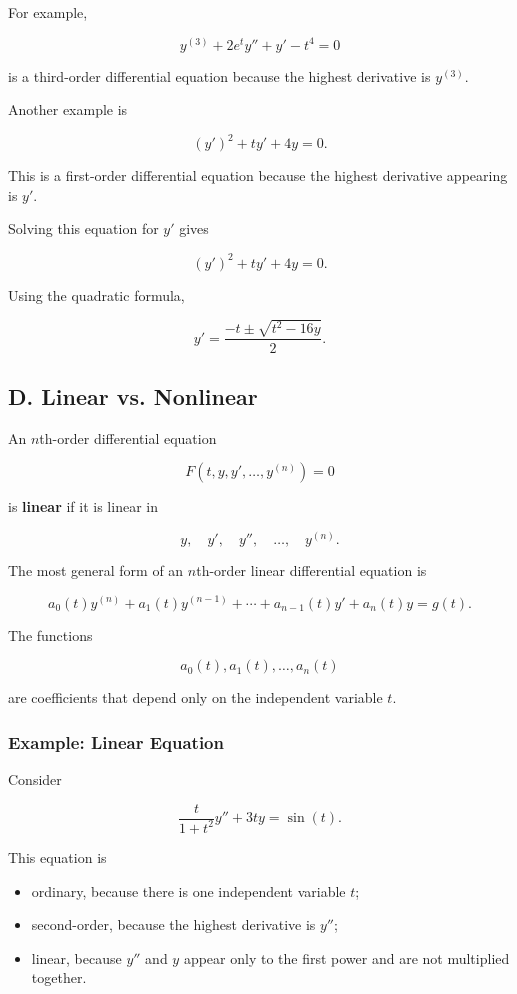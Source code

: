 \documentclass[11pt]{article}
\begin{document}
For example,

\[
y^{(3)}
+
2e^t y''
+
y'
-
t^4
=
0
\]

is a third-order differential equation because the highest derivative
is $y^{(3)}$.

Another example is

\[
(y')^2+ty'+4y=0.
\]

This is a first-order differential equation because the highest
derivative appearing is $y'$.

Solving this equation for $y'$ gives

\[
(y')^2+ty'+4y=0.
\]

Using the quadratic formula,

\[
\boxed{
y'
=
\frac{-t\pm\sqrt{t^2-16y}}{2}
}.
\]

\subsection{D. Linear vs. Nonlinear}

An $n$th-order differential equation

\[
F\left(
t,y,y',\ldots,y^{(n)}
\right)=0
\]

is \textbf{linear} if it is linear in

\[
y,\quad y',\quad y'',\quad\ldots,\quad y^{(n)}.
\]

The most general form of an $n$th-order linear differential equation is

\[
\boxed{
a_0(t)y^{(n)}
+
a_1(t)y^{(n-1)}
+
\cdots
+
a_{n-1}(t)y'
+
a_n(t)y
=
g(t)
}.
\]

The functions

\[
a_0(t),a_1(t),\ldots,a_n(t)
\]

are coefficients that depend only on the independent variable $t$.

\subsubsection{Example: Linear Equation}

Consider

\[
\frac{t}{1+t^2}y''
+
3ty
=
\sin(t).
\]

This equation is

\begin{itemize}
    \item ordinary, because there is one independent variable $t$;
    \item second-order, because the highest derivative is $y''$;
    \item linear, because $y''$ and $y$ appear only to the first power
    and are not multiplied together.
\end{itemize}
\end{document}
